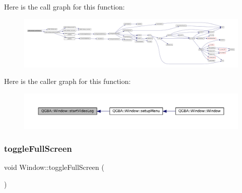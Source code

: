Here is the call graph for this function\+:
\nopagebreak
\begin{figure}[H]
\begin{center}
\leavevmode
\includegraphics[width=350pt]{class_q_g_b_a_1_1_window_a5cb56389e381fc24d6243cbd0a628aa1_cgraph}
\end{center}
\end{figure}
Here is the caller graph for this function\+:
\nopagebreak
\begin{figure}[H]
\begin{center}
\leavevmode
\includegraphics[width=350pt]{class_q_g_b_a_1_1_window_a5cb56389e381fc24d6243cbd0a628aa1_icgraph}
\end{center}
\end{figure}
\mbox{\label{class_q_g_b_a_1_1_window_a4528810005bb005d12e41f0801e8b373}} 
\subsubsection{\texorpdfstring{toggle\+Full\+Screen}{toggleFullScreen}}
{\footnotesize\ttfamily void Window\+::toggle\+Full\+Screen (\begin{DoxyParamCaption}{ }\end{DoxyParamCaption})\hspace{0.3cm}{\ttfamily [slot]}}

